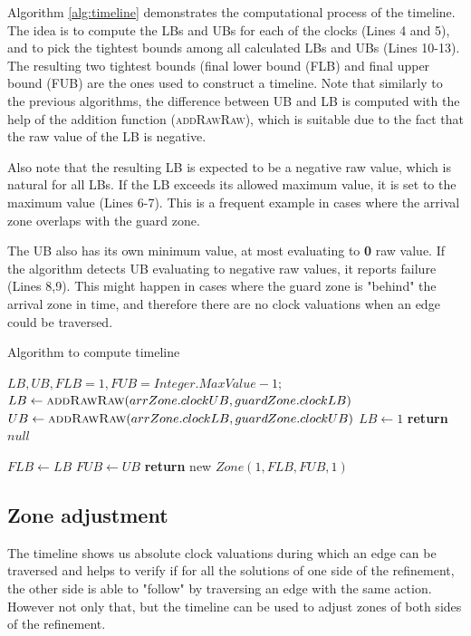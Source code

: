Algorithm \ref{alg:timeline} demonstrates the computational process of the timeline. The idea is to compute the LBs and UBs for each of the clocks (Lines 4 and 5), and to pick the tightest bounds among all calculated LBs and UBs (Lines 10-13). The resulting two tightest bounds (final lower bound (FLB) and final upper bound (FUB) are the ones used to construct a timeline. Note that similarly to the previous algorithms, the difference between UB and LB is computed with the help of the addition function (\textsc{addRawRaw}), which is suitable due to the fact that the raw value of the LB is negative.

Also note that the resulting LB is expected to be a negative raw value, which is natural for all LBs. If the LB exceeds its allowed maximum value, it is set to the maximum value (Lines 6-7). This is a frequent example in cases where the arrival zone overlaps with the guard zone.

The UB also has its own minimum value, at most evaluating to \textbf{0} raw value. If the algorithm detects UB evaluating to negative raw values, it reports failure (Lines 8,9). This might happen in cases where the guard zone is "behind" the arrival zone in time, and therefore there are no clock valuations when an edge could be traversed.
\begin{algorithm}
\caption{Algorithm to compute timeline}
\label{alg:timeline}
\begin{algorithmic}[1]
\State $LB, UB, FLB = 1, FUB = Integer.MaxValue - 1;$
\State $LB \gets \textsc{addRawRaw}(arrZone.clockUB, guardZone.clockLB)$
\State $UB \gets \textsc{addRawRaw}(arrZone.clockLB, guardZone.clockUB)$
\State $LB \gets 1$
\EndIf
{}
\State \textbf{return $null$}
\EndIf

\State $FLB \gets LB$
\EndIf
{}
\State $FUB \gets UB$
\EndIf
\EndFor
\State
\State \textbf{return} new $Zone(1, FLB, FUB, 1)$
\EndFunction
\end{algorithmic}
\end{algorithm}

\subsection{Zone adjustment}
The timeline shows us absolute clock valuations during which an edge can be traversed and helps to verify if for all the solutions of one side of the refinement, the other side is able to "follow" by traversing an edge with the same action. However not only that, but the timeline can be used to adjust zones of both sides of the refinement.

